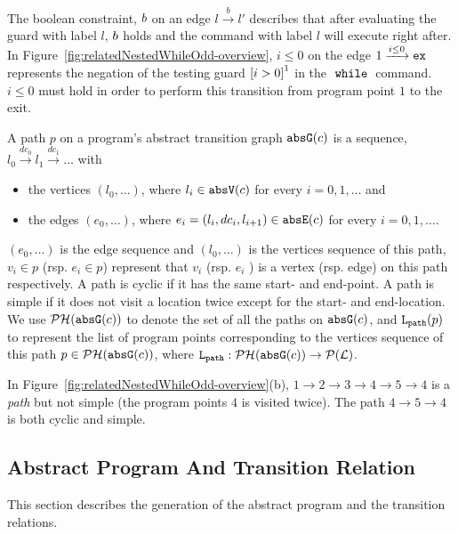 
The boolean constraint, $b$ on an edge $l \xrightarrow{b} l'$ describes
that after evaluating the guard with label $l$,
$b$ holds and the command with label $l$ will execute right after.
In Figure~\ref{fig:relatedNestedWhileOdd-overview}, $i \leq 0 $ on the edge $1 \xrightarrow{i \leq 0} \mathtt{ex}$
represents the negation of the testing guard $\clabel{i > 0}^1$
in the $\;\mathtt{while}\;$ command. $i \leq 0$ must hold in order to perform this transition from program point $1$ to
the exit. 
\begin{defn}[Path]
 \label{def:abs_cfgpath} 
 A path $p$ on a program's abstract transition graph $\mathtt{abs}{\mathtt{G}}(c)$ is a sequence, $ l_0 \xrightarrow{dc_0} l_1 \xrightarrow{dc_1} \ldots $ with
 \begin{itemize}
 \item the vertices $(l_0, \ldots)$, where $l_i \in \mathtt{abs}{\mathtt{V}}(c)$ for every $i = 0, 1, \ldots$ and
 \item the edges $(e_0, \ldots)$, where $e_i = (l_{i}, dc_i, l_{i + 1}) \in \mathtt{abs}{\mathtt{E}}(c)$ for every $i = 0, 1, \ldots$.
 \end{itemize}
  $(e_0, \ldots)$ is the edge sequence and $(l_0, \ldots)$ is the vertices sequence
 of this path, $v_i \in p$ (rsp. $e_i \in p$) represent that $v_i$ (rsp. $e_i$ ) is a vertex (rsp. edge) on this path respectively.
 A path is cyclic if it has the same start- and end-point. A path is simple if it does not visit a location twice except for the start- and end-location. We use $\mathcal{PH}(\mathtt{abs}{\mathtt{G}}(c))$ to denote the set of all the paths on $\mathtt{abs}{\mathtt{G}}(c)$,
 and $\mathtt{L}_{\mathtt{path}}(p)$ to represent the list of program points corresponding to the vertices sequence of this path $p \in \mathcal{PH}(\mathtt{abs}{\mathtt{G}}(c))$,
 where $\mathtt{L}_{\mathtt{path}}: \mathcal{PH}(\mathtt{abs}{\mathtt{G}}(c)) \to \mathcal{P}{(\mathcal{L})}$.
 \end{defn}
 In Figure~\ref{fig:relatedNestedWhileOdd-overview}(b), $1 \to 2 \to 3 \to 4 \to 5 \to 4$ is a \emph{path} but not simple (the program points $4$ is visited twice). The path $4 \to 5 \to 4$ is both cyclic and simple.


\subsection{Abstract Program And Transition Relation}
This section describes the generation of the abstract program and the transition relations.


